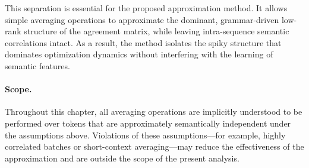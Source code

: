 This separation is essential for the proposed approximation method.
It allows simple averaging operations to approximate the dominant, grammar-driven
low-rank structure of the agreement matrix, while leaving intra-sequence semantic
correlations intact.
As a result, the method isolates the spiky structure that dominates optimization
dynamics without interfering with the learning of semantic features.

\paragraph{Scope.}
Throughout this chapter, all averaging operations are implicitly understood to be
performed over tokens that are approximately semantically independent under the
assumptions above.
Violations of these assumptions---for example, highly correlated batches or
short-context averaging---may reduce the effectiveness of the approximation and are
outside the scope of the present analysis.